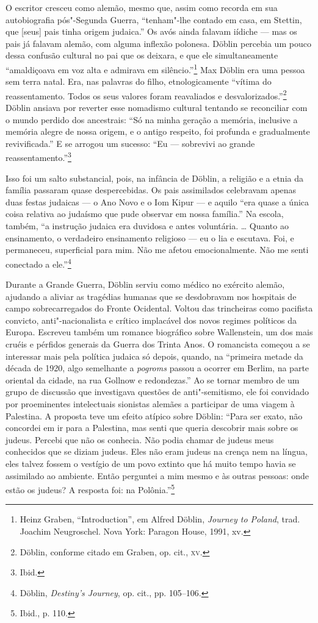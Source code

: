 O escritor cresceu como alemão, mesmo que, assim como recorda em sua
autobiografia pós"-Segunda Guerra, ``tenham"-lhe contado em casa, em
Stettin, que {[}seus{]} pais tinha origem judaica.'' Os avós ainda
falavam iídiche --- mas os pais já falavam alemão, com alguma inflexão
polonesa. Döblin percebia um pouco dessa confusão cultural no pai que os
deixara, e que ele simultaneamente ``amaldiçoava em voz alta e admirava
em silêncio.''\footnote{Heinz Graben, ``Introduction'', em Alfred Döblin, \textit{Journey to Poland}, trad. Joachim Neugroschel. Nova York: Paragon House, 1991, xv.} Max Döblin era uma pessoa sem terra natal. Era, nas palavras do filho, etnologicamente ``vítima do reassentamento.
Todos os seus valores foram reavaliados e desvalorizados.''\footnote{Döblin, conforme citado em Graben, op. cit., \textsc{xv}.} Döblin ansiava por reverter esse nomadismo cultural tentando se reconciliar com o mundo perdido dos
ancestrais: ``Só na minha geração a memória, inclusive a memória alegre
de nossa origem, e o antigo respeito, foi profunda e gradualmente
revivificada.'' E se arrogou um sucesso: ``Eu --- sobrevivi ao grande
reassentamento.''\footnote{Ibid.}

Isso foi um salto substancial, pois, na infância de Döblin, a religião e
a etnia da família passaram quase despercebidas. Os pais assimilados
celebravam apenas duas festas judaicas --- o Ano Novo e o Iom Kipur --- e
aquilo ``era quase a única coisa relativa ao judaísmo que pude observar
em nossa família.'' Na escola, também, ``a instrução judaica era
duvidosa e antes voluntária. \ldots{} Quanto ao ensinamento, o
verdadeiro ensinamento religioso --- eu o lia e escutava. Foi, e
permaneceu, superficial para mim. Não me afetou emocionalmente. Não me
senti conectado a ele.''\footnote{Döblin, \textit{Destiny's Journey}, op. cit., pp. 105--106.}

Durante a Grande Guerra, Döblin serviu como médico no exército alemão,
ajudando a aliviar as tragédias humanas que se desdobravam nos hospitais
de campo sobrecarregados do Fronte Ocidental. Voltou das trincheiras
como pacifista convicto, anti"-nacionalista e crítico implacável dos
novos regimes políticos da Europa. Escreveu também um romance biográfico
sobre Wallenstein, um dos mais cruéis e pérfidos generais da Guerra dos
Trinta Anos. O romancista começou a se interessar mais pela política
judaica só depois, quando, na ``primeira metade da década de 1920, algo
semelhante a \textit{pogroms} passou a ocorrer em Berlim, na parte oriental da
cidade, na rua Gollnow e redondezas.'' Ao se tornar membro de um grupo
de discussão que investigava questões de anti"-semitismo, ele foi
convidado por proeminentes intelectuais sionistas alemães a participar
de uma viagem à Palestina. A proposta teve um efeito atípico sobre
Döblin: ``Para ser exato, não concordei em ir para a Palestina, mas
senti que queria descobrir mais sobre os judeus. Percebi que não os
conhecia. Não podia chamar de judeus meus conhecidos que se diziam
judeus. Eles não eram judeus na crença nem na língua, eles talvez fossem
o vestígio de um povo extinto que há muito tempo havia se assimilado ao
ambiente. Então perguntei a mim mesmo e às outras pessoas: onde estão os
judeus? A resposta foi: na Polônia.''\footnote{Ibid., p. 110.}

